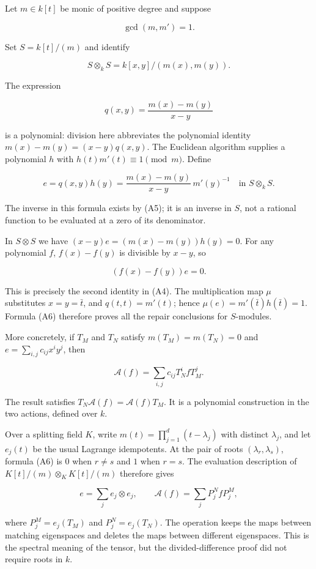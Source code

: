 \documentclass[
  11pt,
]{article}
\begin{document}
Let \(m\in k[t]\) be monic of positive degree and suppose

\[
\gcd(m,m')=1.                                      \tag{A5}
\]

Set \(S=k[t]/(m)\) and identify

\[
S\otimes_kS=k[x,y]/(m(x),m(y)).
\]

The expression

\[
q(x,y)=\frac{m(x)-m(y)}{x-y}
\]

is a polynomial: division here abbreviates the polynomial identity
\(m(x)-m(y)=(x-y)q(x,y)\). The Euclidean algorithm supplies a polynomial
\(h\) with \(h(t)m'(t)\equiv1\pmod m\). Define

\[
e=q(x,y)h(y)
 =\frac{m(x)-m(y)}{x-y}\,m'(y)^{-1}
\quad\text{in }S\otimes_kS.                         \tag{A6}
\]

The inverse in this formula exists by (A5); it is an inverse in \(S\),
not a rational function to be evaluated at a zero of its denominator.

In \(S\otimes S\) we have \((x-y)e=(m(x)-m(y))h(y)=0\). For any
polynomial \(f\), \(f(x)-f(y)\) is divisible by \(x-y\), so

\[
(f(x)-f(y))e=0.
\]

This is precisely the second identity in (A4). The multiplication map
\(\mu\) substitutes \(x=y=\bar t\), and \(q(t,t)=m'(t)\); hence
\(\mu(e)=m'(\bar t)h(\bar t)=1\). Formula (A6) therefore proves all the
repair conclusions for \(S\)-modules.

More concretely, if \(T_M\) and \(T_N\) satisfy \(m(T_M)=m(T_N)=0\) and
\(e=\sum_{i,j}c_{ij}x^i y^j\), then

\[
\mathcal A(f)=\sum_{i,j}c_{ij}T_N^i f T_M^j.         \tag{A7}
\]

The result satisfies \(T_N\mathcal A(f)=\mathcal A(f)T_M\). It is a
polynomial construction in the two actions, defined over \(k\).

Over a splitting field \(K\), write \(m(t)=\prod_{j=1}^d(t-\lambda_j)\)
with distinct \(\lambda_j\), and let \(e_j(t)\) be the usual Lagrange
idempotents. At the pair of roots \((\lambda_r,\lambda_s)\), formula
(A6) is \(0\) when \(r\ne s\) and \(1\) when \(r=s\). The evaluation
description of \(K[t]/(m)\otimes_KK[t]/(m)\) therefore gives

\[
e=\sum_j e_j\otimes e_j,\qquad
\mathcal A(f)=\sum_j P_j^N fP_j^M,                 \tag{A8}
\]

where \(P_j^M=e_j(T_M)\) and \(P_j^N=e_j(T_N)\). The operation keeps the
maps between matching eigenspaces and deletes the maps between different
eigenspaces. This is the spectral meaning of the tensor, but the
divided-difference proof did not require roots in \(k\).
\end{document}
